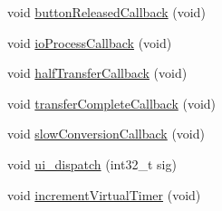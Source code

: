\begin{DoxyCompactItemize}
void \mbox{\hyperlink{class_via_sync_a4cf15c90ec55e77922a7d6b788248544}{button\+Released\+Callback}} (void)
\item 
void \mbox{\hyperlink{class_via_sync_a31d6b55ab3680414fdb82751a3d831b0}{io\+Process\+Callback}} (void)
\item 
void \mbox{\hyperlink{class_via_sync_ac7088351c34bdeecd7b6071e98365791}{half\+Transfer\+Callback}} (void)
\item 
void \mbox{\hyperlink{class_via_sync_a87f2045c71b68d5ecd0da591331b3592}{transfer\+Complete\+Callback}} (void)
\item 
void \mbox{\hyperlink{class_via_sync_aeb70cc589226d3915a5821783f6609a9}{slow\+Conversion\+Callback}} (void)
\item 
void \mbox{\hyperlink{class_via_sync_a2b6602ba148dc95dc06f5410e8451b52}{ui\+\_\+dispatch}} (int32\+\_\+t sig)
\item 
void \mbox{\hyperlink{class_via_sync_a07892a924ff929e8fd33ecec31e2cf19}{increment\+Virtual\+Timer}} (void)
\end{DoxyCompactItemize}
